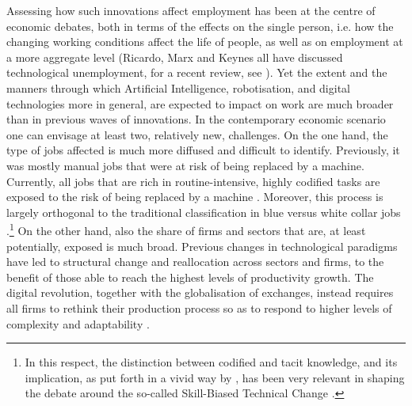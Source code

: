 \documentclass[12pt]{article}
\begin{document}
Assessing how such innovations affect employment has been at the
centre of economic debates, both in terms of the effects on the single
person, i.e. how the changing working conditions affect the life of
people, as well as on employment at a more aggregate level (Ricardo,
Marx and Keynes all have discussed technological unemployment, for a
recent review, see \citealp{piva_vivarelli_2017}). Yet the extent and
the manners through which Artificial Intelligence, robotisation, and
digital technologies more in general, are expected to impact on work
are much broader than in previous waves of innovations.  In the
contemporary economic scenario one can envisage at least two,
relatively new, challenges. On the one hand, the type of jobs affected
is much more diffused and difficult to identify. Previously, it was
mostly manual jobs that were at risk of being replaced by a
machine. Currently, all jobs that are rich in routine-intensive,
highly codified tasks are exposed to the risk of being replaced by a
machine \citep[see, for instance,][]{autor_etal_2003_QJE,
  goos_etal_2014, autor_2015_JEP}. Moreover, this process is largely
orthogonal to the traditional classification in blue versus white
collar jobs \citep[among the others, refer to][]{frey_osborne_2017,
  trajtenberg_2018, furman_seamans_2018}.\footnote{In this respect,
  the distinction between codified and tacit knowledge, and its
  implication, as put forth in a vivid way by \cite{polanyi_1967}, has
  been very relevant in shaping the debate around the so-called
  Skill-Biased Technical Change \citep[see among the many
  others][]{autor_etal_2003_QJE, autor_2015}.} On the other hand, also
the share of firms and sectors that are, at least potentially, exposed
is much broad. Previous changes in technological paradigms have led to
structural change and reallocation across sectors and firms, to the
benefit of those able to reach the highest levels of productivity
growth. The digital revolution, together with the globalisation of
exchanges, instead requires all firms to rethink their production
process so as to respond to higher levels of complexity and
adaptability \citep{caliendo2012}.
\end{document}
